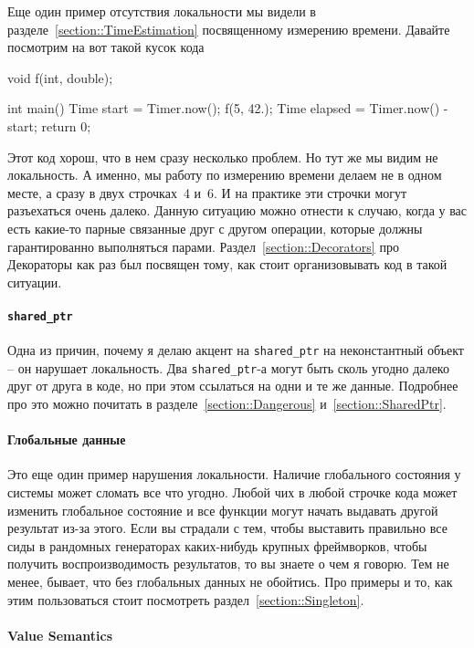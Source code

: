 Еще один пример отсутствия локальности мы видели в разделе~\ref{section::TimeEstimation} посвященному измерению времени.
Давайте посмотрим на вот такой кусок кода
\begin{cppcode}
void f(int, double);

int main() {
  Time start = Timer.now();
  f(5, 42.);
  Time elapsed = Timer.now() - start;
  return 0;
}
\end{cppcode}
Этот код хорош, что в нем сразу несколько проблем.
Но тут же мы видим не локальность.
А именно, мы работу по измерению времени делаем не в одном месте, а сразу в двух строчках~4 и~6.
И на практике эти строчки могут разъехаться очень далеко.
Данную ситуацию можно отнести к случаю, когда у вас есть какие-то парные связанные друг с другом операции, которые должны гарантированно выполняться парами.
Раздел~\ref{section::Decorators} про Декораторы как раз был посвящен тому, как стоит организовывать код в такой ситуации.

\paragraph{\texttt{shared\_ptr}}

Одна из причин, почему я делаю акцент на \texttt{shared\_ptr} на неконстантный объект -- он нарушает локальность.
Два \texttt{shared\_ptr}-а могут быть сколь угодно далеко друг от друга в коде, но при этом ссылаться на одни и те же данные.
Подробнее про это можно почитать в разделе~\ref{section::Dangerous} и~\ref{section::SharedPtr}.

\paragraph{Глобальные данные}

Это еще один пример нарушения локальности.
Наличие глобального состояния у системы может сломать все что угодно.
Любой чих в любой строчке кода может изменить глобальное состояние и все функции могут начать выдавать другой результат из-за этого.
Если вы страдали с тем, чтобы выставить правильно все сиды в рандомных генераторах каких-нибудь крупных фреймворков, чтобы получить воспроизводимость результатов, то вы знаете о чем я говорю.
Тем не менее, бывает, что без глобальных данных не обойтись.
Про примеры и то, как этим пользоваться стоит посмотреть раздел~\ref{section::Singleton}.

\paragraph{Value Semantics}

